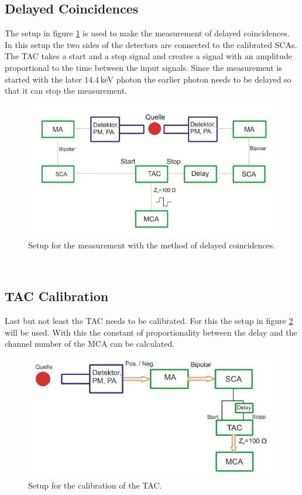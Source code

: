 \documentclass[30pt,a4paper]{article}
\begin{document}
 	\subsection{Delayed Coincidences}
 	The setup in figure \ref{setup_DC} is used to make the measurement of delayed coincidences. In this setup the two sides of the detectors are connected to the calibrated SCAs. The TAC takes a start and a stop signal and creates a signal with an amplitude proportional to the time between the input signals. Since the measurement is started with the later $14.4$\,keV photon the earlier photon needs to be delayed so that it can stop the measurement.\cite{Anleitung}
 	\begin{figure}[h]
 		\includegraphics{Bilder/Circuit_DC}
 		\centering
 		\caption[Delayed Coincidences Setup]{\small Setup for the measurement with the method of delayed coincidences. \cite{Anleitung}}
 		\label{setup_DC}
 	\end{figure}\\
 	\subsection{TAC Calibration}
 	Last but not least the TAC needs to be calibrated. For this the setup in figure \ref{setup_TC} will be used. With this the constant of proportionality between the delay and the channel number of the MCA can be calculated. \cite{Anleitung}
 	\begin{figure}[h]
 		\includegraphics{Bilder/Circuit_DC_calib}
 		\centering
 		\caption[Time Calibration Setup]{\small Setup for the calibration of the TAC. \cite{Anleitung}}
 		\label{setup_TC}
 	\end{figure}\\
\end{document}

